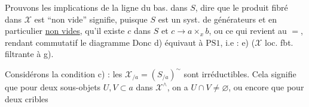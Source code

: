Prouvons les implications de la ligne du bas.  
dans $S$, dire que le produit fibré dans $\mathscr X$ est ``non vide'' signifie, puisque $S$ est un syst. de générateurs  et en particulier \uline{non vides}, qu'il existe $c$ dans $S$ et $c\longrightarrow a\times_x b$, ou ce qui revient au $=$,
rendant commutatif le diagramme
Donc d) équivaut à $\mathrm{PS}1$, i.e : e) ($\mathscr X$ loc. fbt. filtrante à g).

Considérons la condition c) : les $\mathscr X_{/a}=(S_{/a})^{\sim}$ sont irréductibles. Cela signifie que pour deux sous-objets  $U,V\subset a$ dans $\mathscr X^{\wedge}$, on a $U\cap V\ne\varnothing$, ou encore que pour deux cribles

